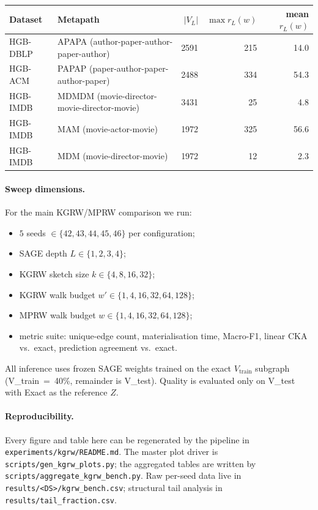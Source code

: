 \documentclass[11pt]{article}
\begin{document}
\begin{center}
\begin{tabular}{llrrr}
\toprule
Dataset & Metapath & $|V_L|$ & $\max r_L(w)$ & mean $r_L(w)$ \\
\midrule
HGB-DBLP & APAPA (author-paper-author-paper-author) & 2591 & 215 & 14.0 \\
HGB-ACM  & PAPAP (paper-author-paper-author-paper)  & 2488 & 334 & 54.3 \\
HGB-IMDB & MDMDM (movie-director-movie-director-movie) & 3431 & 25 & 4.8 \\
HGB-IMDB & MAM   (movie-actor-movie)                & 1972 & 325 & 56.6 \\
HGB-IMDB & MDM   (movie-director-movie)             & 1972 & 12  & 2.3 \\
\bottomrule
\end{tabular}
\end{center}

\paragraph{Sweep dimensions.}
For the main KGRW/MPRW comparison we run:
\begin{itemize}\itemsep2pt
\item $5$ seeds $\in \{42, 43, 44, 45, 46\}$ per configuration;
\item SAGE depth $L \in \{1, 2, 3, 4\}$;
\item KGRW sketch size $k \in \{4, 8, 16, 32\}$;
\item KGRW walk budget $w' \in \{1, 4, 16, 32, 64, 128\}$;
\item MPRW walk budget $w \in \{1, 4, 16, 32, 64, 128\}$;
\item metric suite: unique-edge count, materialisation time, Macro-F1,
linear CKA vs.\ exact, prediction agreement vs.\ exact.
\end{itemize}
All inference uses frozen SAGE weights trained on the exact $V_\text{train}$
subgraph (V\_train~=~40\%, remainder is V\_test). Quality is evaluated only on
V\_test with Exact as the reference $Z$.

\paragraph{Reproducibility.}
Every figure and table here can be regenerated by the pipeline in
\texttt{experiments/kgrw/README.md}. The master plot driver is
\texttt{scripts/gen\_kgrw\_plots.py}; the aggregated tables are written by
\texttt{scripts/aggregate\_kgrw\_bench.py}. Raw per-seed data live in
\texttt{results/<DS>/kgrw\_bench.csv}; structural tail analysis in
\texttt{results/tail\_fraction.csv}.
\end{document}
